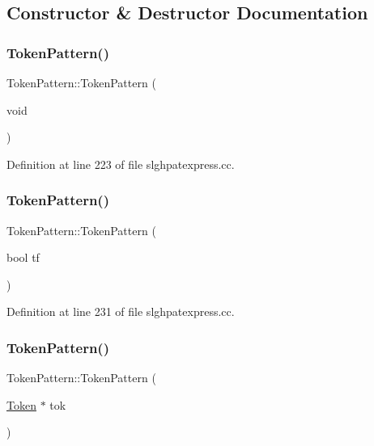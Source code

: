 \subsection{Constructor \& Destructor Documentation}
\mbox{\label{class_token_pattern_a81497849725bea3d3a16ca8bc73c7439}} 
\subsubsection{\texorpdfstring{TokenPattern()}{TokenPattern()}\hspace{0.1cm}{\footnotesize\ttfamily [1/6]}}
{\footnotesize\ttfamily Token\+Pattern\+::\+Token\+Pattern (\begin{DoxyParamCaption}\item[{void}]{ }\end{DoxyParamCaption})}



Definition at line 223 of file slghpatexpress.\+cc.

\mbox{\label{class_token_pattern_ae0798c288cfb9a79be1588db259ce167}} 
\subsubsection{\texorpdfstring{TokenPattern()}{TokenPattern()}\hspace{0.1cm}{\footnotesize\ttfamily [2/6]}}
{\footnotesize\ttfamily Token\+Pattern\+::\+Token\+Pattern (\begin{DoxyParamCaption}\item[{bool}]{tf }\end{DoxyParamCaption})}



Definition at line 231 of file slghpatexpress.\+cc.

\mbox{\label{class_token_pattern_aec8888a1d631dd59d84283b33f604f1d}} 
\subsubsection{\texorpdfstring{TokenPattern()}{TokenPattern()}\hspace{0.1cm}{\footnotesize\ttfamily [3/6]}}
{\footnotesize\ttfamily Token\+Pattern\+::\+Token\+Pattern (\begin{DoxyParamCaption}\item[{\mbox{\hyperlink{class_token}{Token}} $\ast$}]{tok }\end{DoxyParamCaption})}




